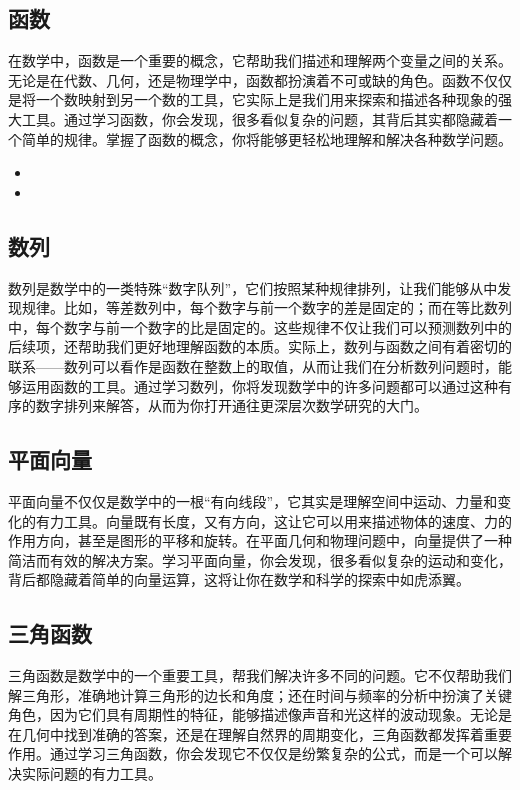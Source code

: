 \subsection{函数}

在数学中，函数是一个重要的概念，它帮助我们描述和理解两个变量之间的关系。无论是在代数、几何，还是物理学中，函数都扮演着不可或缺的角色。函数不仅仅是将一个数映射到另一个数的工具，它实际上是我们用来探索和描述各种现象的强大工具。通过学习函数，你会发现，很多看似复杂的问题，其背后其实都隐藏着一个简单的规律。掌握了函数的概念，你将能够更轻松地理解和解决各种数学问题。
\begin{itemize}
\item {}
\item {}

\end{itemize}
\subsection{数列}

数列是数学中的一类特殊“数字队列”，它们按照某种规律排列，让我们能够从中发现规律。比如，等差数列中，每个数字与前一个数字的差是固定的；而在等比数列中，每个数字与前一个数字的比是固定的。这些规律不仅让我们可以预测数列中的后续项，还帮助我们更好地理解函数的本质。实际上，数列与函数之间有着密切的联系——数列可以看作是函数在整数上的取值，从而让我们在分析数列问题时，能够运用函数的工具。通过学习数列，你将发现数学中的许多问题都可以通过这种有序的数字排列来解答，从而为你打开通往更深层次数学研究的大门。

\subsection{平面向量}

平面向量不仅仅是数学中的一根“有向线段”，它其实是理解空间中运动、力量和变化的有力工具。向量既有长度，又有方向，这让它可以用来描述物体的速度、力的作用方向，甚至是图形的平移和旋转。在平面几何和物理问题中，向量提供了一种简洁而有效的解决方案。学习平面向量，你会发现，很多看似复杂的运动和变化，背后都隐藏着简单的向量运算，这将让你在数学和科学的探索中如虎添翼。

\subsection{三角函数}

三角函数是数学中的一个重要工具，帮我们解决许多不同的问题。它不仅帮助我们解三角形，准确地计算三角形的边长和角度；还在时间与频率的分析中扮演了关键角色，因为它们具有周期性的特征，能够描述像声音和光这样的波动现象。无论是在几何中找到准确的答案，还是在理解自然界的周期变化，三角函数都发挥着重要作用。通过学习三角函数，你会发现它不仅仅是纷繁复杂的公式，而是一个可以解决实际问题的有力工具。

